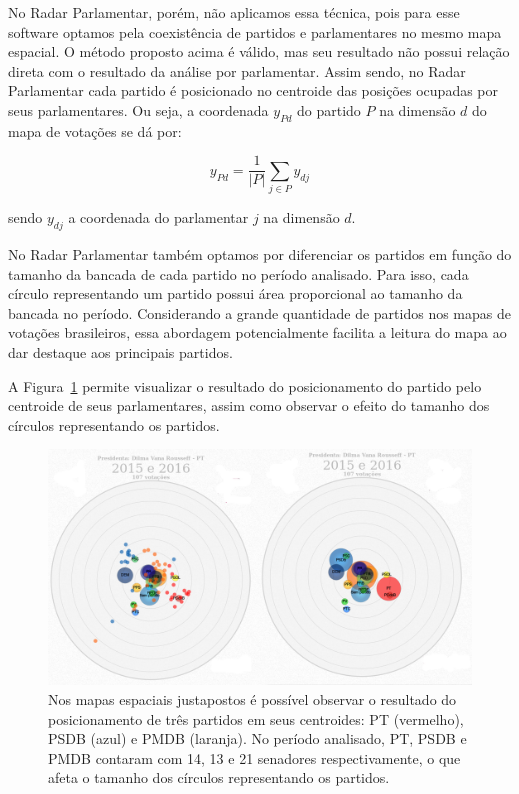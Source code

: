 \documentclass[
	article,			%
	12pt,				%
	oneside,			%
	a4paper,			%
	english,			%
	brazil,				%
	sumario=tradicional,
	oldfontcommands %
	]{abntex2}
\begin{document}
No Radar Parlamentar, porém, não aplicamos essa técnica, pois para esse software optamos pela coexistência de partidos e parlamentares no mesmo mapa espacial. O método proposto acima é válido, mas seu resultado não possui relação direta com o resultado da análise por parlamentar. Assim sendo, no Radar Parlamentar cada partido é posicionado no centroide das posições ocupadas por seus parlamentares. Ou seja, a coordenada $y_{Pd}$ do partido $P$ na dimensão $d$ do mapa de votações se dá por:

\begin{equation}
  y_{Pd} = \frac{1}{|P|}\sum_{j\in P}{y_{dj}}
  \label{eq:partido-centroide}
\end{equation}

sendo $y_{dj}$ a coordenada do parlamentar $j$ na dimensão $d$.

No Radar Parlamentar também optamos por diferenciar os partidos em função do tamanho da bancada de cada partido no período analisado. Para isso, cada círculo representando um partido possui área proporcional ao tamanho da bancada no período. Considerando a grande quantidade de partidos nos mapas de votações brasileiros, essa abordagem potencialmente facilita a leitura do mapa ao dar destaque aos principais partidos.

A Figura~\ref{fig:centroide} permite visualizar o resultado do posicionamento do partido pelo centroide de seus parlamentares, assim como observar o efeito do tamanho dos círculos representando os partidos.

\begin{figure}[h]
  \centering
  \includegraphics[scale=0.37]{figs/centroide.png}
  \caption{Nos mapas espaciais justapostos é possível observar o resultado do posicionamento de três partidos em seus centroides: PT (vermelho), PSDB (azul) e PMDB (laranja). No período analisado, PT, PSDB e PMDB contaram com 14, 13 e 21 senadores respectivamente, o que afeta o tamanho dos círculos representando os partidos.}
  \label{fig:centroide}
\end{figure}
\end{document}
